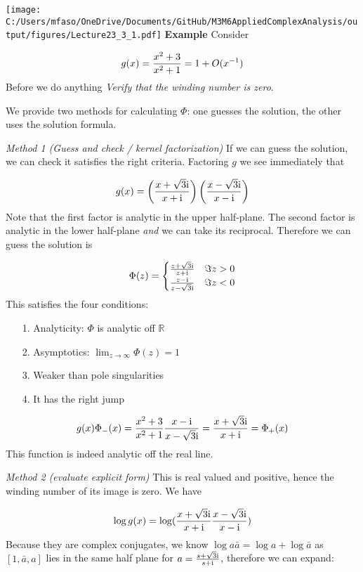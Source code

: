 \documentclass[12pt,landscape]{article}
\def\I{ {\rm i} }
\def\R{ {\mathbb R} }
\begin{document}
{\texttt{[image: C:/Users/mfaso/OneDrive/Documents/GitHub/M3M6AppliedComplexAnalysis/output/figures/Lecture23\_3\_1.pdf]}
\newpage
\textbf{Example} Consider

\[
g(x) = {x^2+3 \over x^2+1} = 1 + O(x^{-1})
\]
Before we do anything \emph{Verify that the winding number is zero}.

We provide two methods for calculating $\Phi$: one guesses the solution, the other uses the solution formula.

\emph{Method 1 (Guess and check / kernel factorization)} If we can guess the solution, we can check it satisfies the right criteria.   Factoring $g$ we see immediately that

\[
g(x) = \left({x+\sqrt{3} \I \over x+\I}\right)\left({ x-\sqrt{3} \I \over  x-\I}\right) 
\]
Note that the first factor is analytic in  the upper half-plane. The second factor is analytic in the lower half-plane \emph{and} we can take its reciprocal. Therefore we can guess the solution is

\[
\Phi(z)  = \begin{cases}
        {z+\sqrt 3\I \over z+\I} & \Im z > 0 \\
            {z-\I \over z-\sqrt 3\I} & \Im z < 0
           \end{cases}
\]
This satisfies the four conditions:

\begin{itemize}
\item[1. ] Analyticity: $\Phi$ is analytic off $\R$


\item[2. ] Asymptotics: $\lim_{z\rightarrow \infty}\Phi(z) = 1$


\item[3. ] Weaker than pole singularities


\item[4. ] It has the right jump

\end{itemize}
\[
g(x) \Phi_-(x) =  {x^2+3 \over x^2+1} {x-\I \over x-\sqrt 3\I}  = {x+\sqrt 3 \I\over x+\I} = \Phi_+(x)
\]
This function is indeed analytic off the real line.

\emph{Method 2 (evaluate explicit form)} This is real valued and positive, hence the winding number of its image is zero.  We have

\[
\log g(x) = \log({x+\sqrt 3\I \over x+\I}{x-\sqrt 3\I \over x-\I})
\]
Because they are complex conjugates, we know $\log a \bar a = \log a + \log \bar a$ as $[1, \bar a, a]$ lies in the same half plane for $a = {s+\sqrt 3 \I \over s+ \I}$, therefore we can expand:

}
\end{document}
